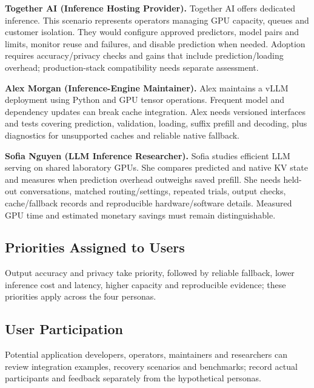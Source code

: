 \documentclass[12pt]{article}
\begin{document}
\par\medskip\noindent{}\label{persona:together}
\textbf{Together AI (Inference Hosting Provider).}
Together AI offers dedicated inference.
This scenario represents operators managing GPU capacity, queues and customer
isolation. They would configure approved predictors, model pairs and limits,
monitor reuse and failures, and disable prediction when needed. Adoption
requires accuracy/privacy checks and gains that include prediction/loading
overhead; production-stack compatibility needs separate assessment.

\par\medskip\noindent{}\label{persona:alex}
\textbf{Alex Morgan (Inference-Engine Maintainer).}
Alex maintains a vLLM deployment using Python and GPU tensor operations.
Frequent model and dependency updates can break cache integration. Alex needs
versioned interfaces and tests covering prediction, validation, loading,
suffix prefill and decoding, plus diagnostics for unsupported caches and
reliable native fallback.

\par\medskip\noindent{}\label{persona:sofia}
\textbf{Sofia Nguyen (LLM Inference Researcher).}
Sofia studies efficient LLM serving on shared laboratory GPUs. She compares
predicted and native KV state and measures when prediction overhead outweighs
saved prefill. She needs held-out conversations, matched routing/settings,
repeated trials, output checks, cache/fallback records and reproducible
hardware/software details. Measured GPU time and estimated monetary savings
must remain distinguishable.


\subsection{Priorities Assigned to Users}
Output accuracy and privacy take priority, followed by reliable fallback,
lower inference cost and latency, higher capacity and reproducible evidence;
these priorities apply across the four personas.


\subsection{User Participation}
Potential application developers, operators, maintainers and researchers can
review integration examples, recovery scenarios and benchmarks; record actual
participants and feedback separately from the hypothetical personas.
\end{document}
